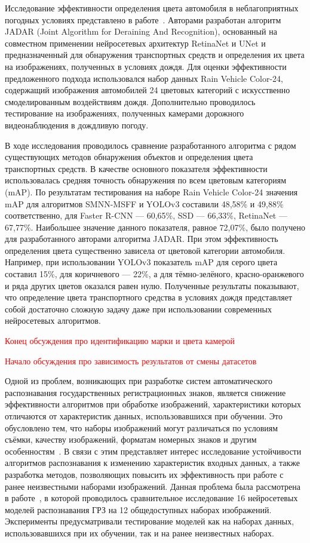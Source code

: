\documentclass[12pt]{article}
\theoremstyle{definition}
\begin{document}
Исследование эффективности определения цвета автомобиля в неблагоприятных погодных условиях представлено в работе~\cite{Hu2022}. Авторами разработан алгоритм JADAR (Joint Algorithm for Deraining And Recognition), основанный на совместном применении нейросетевых архитектур RetinaNet и UNet и предназначенный для обнаружения транспортных средств и определения их цвета на изображениях, полученных в условиях дождя. Для оценки эффективности предложенного подхода использовался набор данных Rain Vehicle Color-24, содержащий изображения автомобилей 24 цветовых категорий с искусственно смоделированным воздействиям дождя. Дополнительно проводилось тестирование на изображениях, полученных камерами дорожного видеонаблюдения в дождливую погоду.

В ходе исследования проводилось сравнение разработанного алгоритма с рядом существующих методов обнаружения объектов и определения цвета транспортных средств. В качестве основного показателя эффективности использовалась средняя точность обнаружения по всем цветовым категориям (mAP). По результатам тестирования на наборе Rain Vehicle Color-24 значения mAP для алгоритмов SMNN-MSFF и YOLOv3 составили 48,58\% и 49,88\% соответственно, для Faster R-CNN — 60,65\%, SSD — 66,33\%, RetinaNet — 67,77\%. Наибольшее значение данного показателя, равное 72,07\%, было получено для разработанного авторами алгоритма JADAR. При этом эффективность определения цвета существенно зависела от цветовой категории автомобиля. Например, при использовании YOLOv3 показатель mAP для серого цвета составил 15\%, для коричневого — 22\%, а для тёмно-зелёного, красно-оранжевого и ряда других цветов оказался равен нулю. Полученные результаты показывают, что определение цвета транспортного средства в условиях дождя представляет собой достаточно сложную задачу даже при использовании современных нейросетевых алгоритмов. 

\textcolor{red}{Конец обсуждения про идентификацию марки и цвета камерой}

\textcolor{red}{Начало обсуждения про зависимость результатов от смены датасетов}

Одной из проблем, возникающих при разработке систем автоматического распознавания государственных регистрационных знаков, является снижение эффективности алгоритмов при обработке изображений, характеристики которых отличаются от характеристик данных, использовавшихся при обучении. Это обусловлено тем, что наборы изображений могут различаться по условиям съёмки, качеству изображений, форматам номерных знаков и другим особенностям~\cite{Wang2025, Khokhar2024, Laroca2022, Laroca2022a}. В связи с этим представляет интерес исследование устойчивости алгоритмов распознавания к изменению характеристик входных данных, а также разработка методов, позволяющих повысить их эффективность при работе с ранее неизвестными наборами изображений. Данная проблема была рассмотрена в работе~\cite{Laroca2025}, в которой проводилось сравнительное исследование 16 нейросетевых моделей распознавания ГРЗ на 12 общедоступных наборах изображений. Эксперименты предусматривали тестирование моделей как на наборах данных, использовавшихся при их обучении, так и на ранее неизвестных наборах.
\end{document}
